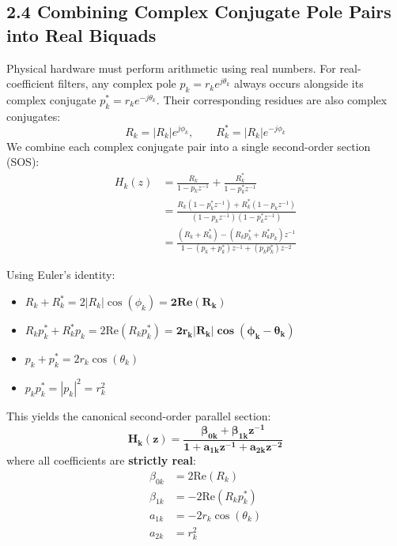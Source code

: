 \documentclass[11pt,a4paper]{article}
\begin{document}
\subsection{2.4 Combining Complex Conjugate Pole Pairs into Real Biquads}
Physical hardware must perform arithmetic using real numbers. For real-coefficient filters, any complex pole $p_k = r_k e^{j\theta_k}$ always occurs alongside its complex conjugate $p_k^* = r_k e^{-j\theta_k}$. Their corresponding residues are also complex conjugates:
\begin{equation}
R_k = |R_k| e^{j\phi_k}, \qquad R_k^* = |R_k| e^{-j\phi_k}
\end{equation}
We combine each complex conjugate pair into a single second-order section (SOS):
\begin{align}
H_k(z) &= \frac{R_k}{1 - p_k z^{-1}} + \frac{R_k^*}{1 - p_k^* z^{-1}} \nonumber \\
&= \frac{R_k (1 - p_k^* z^{-1}) + R_k^* (1 - p_k z^{-1})}{(1 - p_k z^{-1})(1 - p_k^* z^{-1})} \nonumber \\
&= \frac{(R_k + R_k^*) - (R_k p_k^* + R_k^* p_k) z^{-1}}{1 - (p_k + p_k^*) z^{-1} + (p_k p_k^*) z^{-2}}
\end{align}

Using Euler's identity:
\begin{itemize}
    \item $R_k + R_k^* = 2 |R_k| \cos(\phi_k) = \mathbf{2 \text{Re}(R_k)}$
    \item $R_k p_k^* + R_k^* p_k = 2 \text{Re}(R_k p_k^*) = \mathbf{2 r_k |R_k| \cos(\phi_k - \theta_k)}$
    \item $p_k + p_k^* = 2 r_k \cos(\theta_k)$
    \item $p_k p_k^* = |p_k|^2 = r_k^2$
\end{itemize}

This yields the canonical second-order parallel section:
\begin{equation}
\mathbf{H_k(z) = \frac{\beta_{0k} + \beta_{1k} z^{-1}}{1 + a_{1k} z^{-1} + a_{2k} z^{-2}}}
\label{eq:parallel_sos_formula}
\end{equation}
where all coefficients are \textbf{strictly real}:
\begin{align}
\beta_{0k} &= 2 \text{Re}(R_k) \\
\beta_{1k} &= -2 \text{Re}(R_k p_k^*) \\
a_{1k}     &= -2 r_k \cos(\theta_k) \\
a_{2k}     &= r_k^2
\end{align}
\end{document}
